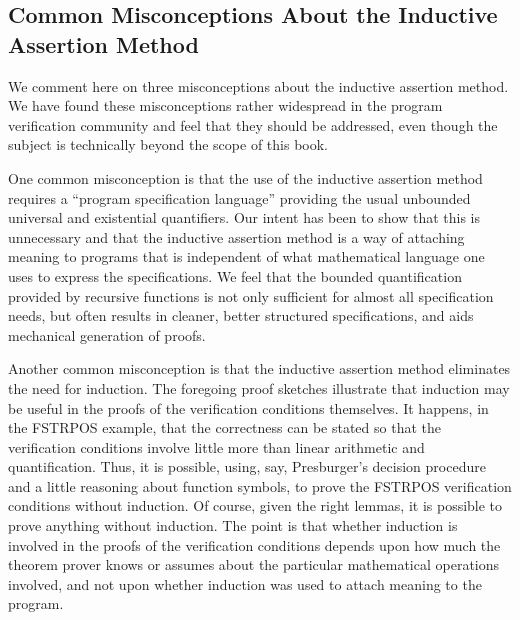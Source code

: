 \documentclass[11pt]{book}
\newcommand{\pubdefaulttextsize}{\large}
\begin{document}
\subsection{Common Misconceptions About the Inductive Assertion Method}
\pubdefaulttextsize
We comment here on three misconceptions
about the inductive assertion method.  We have found these misconceptions
rather widespread in the program verification community and feel that
they should be addressed, even though the subject is technically
beyond the scope of this book.

One common misconception is that the use of the inductive assertion
method requires a ``program specification language'' providing the usual
unbounded universal and existential quantifiers.
Our intent has been to show that this is unnecessary
and that the inductive assertion method is a way of attaching meaning
to programs that is independent of what mathematical language one uses
to express the specifications.  We feel that the bounded quantification provided by
recursive functions is not only sufficient for almost all
specification needs, but often results in cleaner, better structured specifications,
and aids mechanical generation of proofs.

Another common misconception is that the inductive assertion
method eliminates the need for induction.  The foregoing proof
sketches illustrate that induction may be useful in the proofs
of the verification conditions themselves.  It happens, in the
FSTRPOS example, that the correctness can be stated so that the verification
conditions involve little more than linear arithmetic and quantification.
Thus, it is possible, using, say, Presburger's decision procedure \cite{PRESBURGER} and a little
reasoning about function symbols, to prove the
FSTRPOS verification conditions without induction.  Of course, given
the right lemmas, it is possible to prove anything without induction.
The point is that whether induction is involved in the proofs of
the verification conditions depends upon how much the theorem
prover knows or assumes about the particular mathematical operations
involved, and not upon whether induction was used to attach meaning
to the program.
\end{document}

